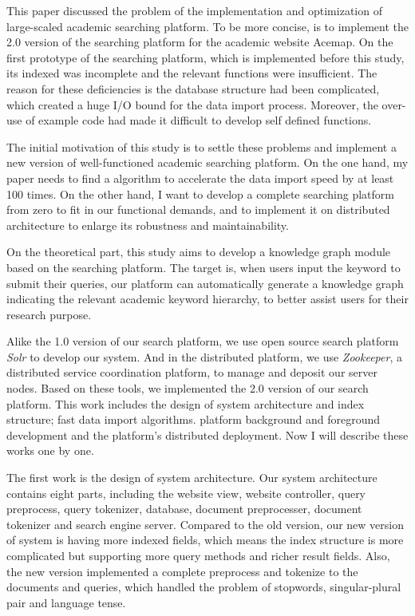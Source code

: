 \begin{bigabstract}
This paper discussed the problem of the implementation and optimization of large-scaled academic searching platform. To be more concise, is to implement the 2.0 version of the searching platform for the academic website Acemap. On the first prototype of the searching platform, which is implemented before this study, its indexed was incomplete and the relevant functions were insufficient. The reason for these deficiencies is the database structure had been complicated, which created a huge I/O bound for the data import process. Moreover, the over-use of example code had made it difficult to develop self defined functions.

The initial motivation of this study is to settle these problems and implement a new version of well-functioned academic searching platform. On the one hand, my paper needs to find a algorithm to accelerate the data import speed by at least 100 times. On the other hand, I want to develop a complete searching platform from zero to fit in our functional demands, and to implement it on distributed architecture to enlarge its robustness and maintainability.

On the theoretical part, this study aims to develop a knowledge graph module based on the searching platform. The target is, when users input the keyword to submit their queries, our platform can automatically generate a knowledge graph indicating the relevant academic keyword hierarchy, to better assist users for their research purpose.

Alike the 1.0 version of our search platform, we use open source search platform \emph{Solr} to develop our system. And in the distributed platform, we use \emph{Zookeeper}, a distributed service coordination platform, to manage and deposit our server nodes. Based on these tools, we implemented the 2.0 version of our search platform. This work includes the design of system architecture and index structure; fast data import algorithms. platform background and foreground development and the platform's distributed deployment. Now I will describe these works one by one.

The first work is the design of system architecture. Our system architecture contains eight parts, including the website view, website controller, query preprocess, query tokenizer, database, document preprocesser, document tokenizer and search engine server. Compared to the old version, our new version of system is having more indexed fields, which means the index structure is more complicated but supporting more query methods and richer result fields. Also, the new version implemented a complete preprocess and tokenize to the documents and queries, which handled the problem of stopwords, singular-plural pair and language tense.


\end{bigabstract}

